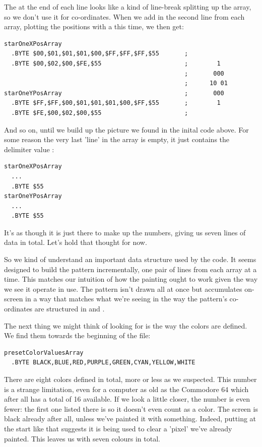 The  at the end of each line looks like a kind of line-break splitting up the array, so we don't use it for
co-ordinates. 
When we add in the second line from each array, plotting the positions with a  this time, we then get:

\begin{lstlisting}[caption=Source code for the Star.]
starOneXPosArray  
  .BYTE $00,$01,$01,$01,$00,$FF,$FF,$FF,$55       ;                
  .BYTE $00,$02,$00,$FE,$55                       ;        1 
                                                  ;       000      
                                                  ;      10 01       
starOneYPosArray                                  ;       000
  .BYTE $FF,$FF,$00,$01,$01,$01,$00,$FF,$55       ;        1  
  .BYTE $FE,$00,$02,$00,$55                       ; 
\end{lstlisting}

And so on, until we build up the picture we found in the inital code above. For some reason the very last 'line' in the 
array is empty, it just contains the delimiter value :

\begin{lstlisting}
starOneXPosArray  
  ...
  .BYTE $55  
starOneYPosArray  
  ...
  .BYTE $55      
\end{lstlisting}

It's as though it is just there to make up the numbers, giving us
seven lines of data in total. Let's hold that thought for now.

So we kind of understand an important data structure used
by the code. It seems designed to build the pattern incrementally, one pair of lines from each array at a time.
This matches our intuition of how the painting ought to work given the way we see it operate in use. The pattern isn't drawn
all at once but accumulates on-screen in a way that matches what we're seeing in the way the pattern's co-ordinates
are structured in  and .

The next thing we might think of looking for is the way the colors are defined. We find them towards the beginning of the file:
\begin{lstlisting}
presetColorValuesArray
  .BYTE BLACK,BLUE,RED,PURPLE,GREEN,CYAN,YELLOW,WHITE
\end{lstlisting}

There are eight colors defined in total, more or less as we suspected. This number is a strange limitation, even for a computer as old
as the Commodore 64 which after all has a total of 16 available. If we look a little closer, the number is even
fewer: the first one listed there is  so it doesn't even count as a color. The screen is black already after all, unless we've
painted it with something. Indeed, putting  at the 
start like that suggests it is being used to clear a 'pixel' we've already painted. This leaves us with seven 
colours in total. 

